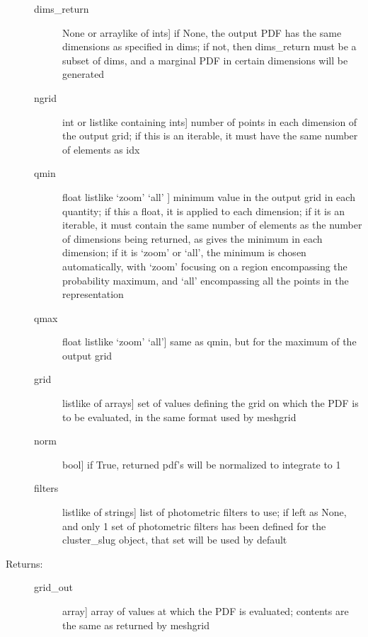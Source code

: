 \documentclass[letterpaper,10pt,english]{sphinxmanual}
\begin{document}
\begin{fulllineitems}
\begin{fulllineitems}
\begin{description}
\begin{description}
\item[{dims\_return}] \leavevmode{[}None or arraylike of ints{]}
if None, the output PDF has the same dimensions as
specified in dims; if not, then dims\_return must be a
subset of dims, and a marginal PDF in certain dimensions
will be generated

\item[{ngrid}] \leavevmode{[}int or listlike containing ints{]}
number of points in each dimension of the output grid;
if this is an iterable, it must have the same number of
elements as idx

\item[{qmin}] \leavevmode{[}float \textbar{} listlike \textbar{} ‘zoom’ \textbar{} ‘all’ {]}
minimum value in the output grid in each quantity; if
this a float, it is applied to each dimension; if it is
an iterable, it must contain the same number of elements
as the number of dimensions being returned, as gives the
minimum in each dimension; if it is ‘zoom’ or ‘all’, the
minimum is chosen automatically, with ‘zoom’ focusing on
a region encompassing the probability maximum, and ‘all’
encompassing all the points in the representation

\item[{qmax}] \leavevmode{[}float \textbar{} listlike \textbar{} ‘zoom’ \textbar{} ‘all’{]}
same as qmin, but for the maximum of the output grid

\item[{grid}] \leavevmode{[}listlike of arrays{]}
set of values defining the grid on which the PDF is to
be evaluated, in the same format used by meshgrid

\item[{norm}] \leavevmode{[}bool{]}
if True, returned pdf’s will be normalized to integrate
to 1

\item[{filters}] \leavevmode{[}listlike of strings{]}
list of photometric filters to use; if left as None, and
only 1 set of photometric filters has been defined for
the cluster\_slug object, that set will be used by
default

\end{description}

\item[{Returns:}] \leavevmode\begin{description}
\item[{grid\_out}] \leavevmode{[}array{]}
array of values at which the PDF is evaluated; contents
are the same as returned by meshgrid


\end{description}
\end{description}
\end{fulllineitems}
\end{fulllineitems}
\end{document}
